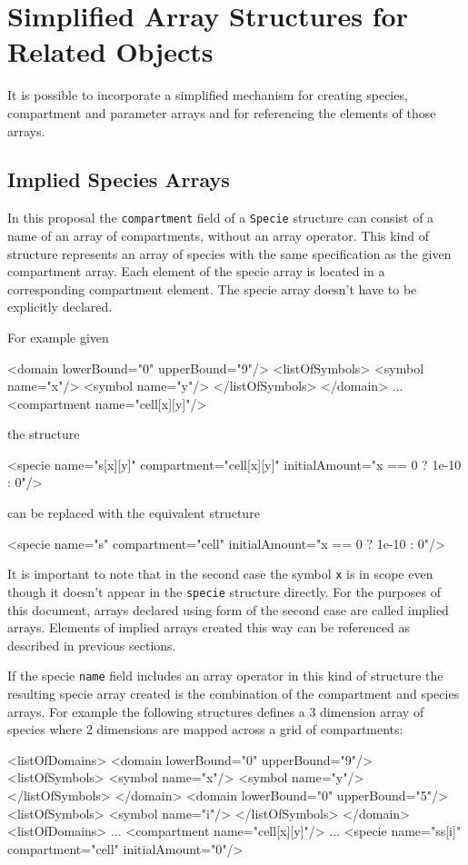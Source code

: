 \documentclass{cekarticle}
\begin{document}
\section{Simplified Array Structures for Related Objects}

It is possible to incorporate a simplified mechanism for creating
species, compartment and parameter arrays and for referencing the
elements of those arrays.

\subsection{Implied Species Arrays}
\label{sec:impliedarrays}

In this proposal the \texttt{compartment} field of a
\texttt{Specie} structure can consist of a name of an array of
compartments, without an array operator. This kind of structure
represents an array of species with the same specification as the
given compartment array.  Each element of the specie array is
located in a corresponding compartment element.  The specie array
doesn't have to be explicitly declared.

For example given
\begin{example}
<domain lowerBound="0" upperBound="9"/>
    <listOfSymbols>
        <symbol name="x"/>
        <symbol name="y"/>
    </listOfSymbols>
</domain>
...
<compartment name="cell[x][y]"/>
\end{example}
the structure
\begin{example}
<specie name="s[x][y]" compartment="cell[x][y]" initialAmount="x == 0 ? 1e-10 : 0"/>
\end{example}
can be replaced with the equivalent structure
\begin{example}
<specie name="s" compartment="cell" initialAmount="x == 0 ? 1e-10 : 0"/>
\end{example}

It is important to note that in the second case the symbol
\texttt{x} is in scope even though it doesn't appear in the
\texttt{specie} structure directly.  For the purposes of this
document, arrays declared using form of the second case are called
implied arrays. Elements of implied arrays created this way can
be referenced as described in previous sections.

If the specie \texttt{name} field includes an array operator in this kind of
structure the resulting specie array created is the combination
of the compartment and species arrays.  For example the following structures defines a 3
dimension array of species where 2 dimensions are mapped across a
grid of compartments:
\begin{example}
<listOfDomains>
    <domain lowerBound="0" upperBound="9"/>
        <listOfSymbols>
            <symbol name="x"/>
            <symbol name="y"/>
        </listOfSymbols>
    </domain>
    <domain lowerBound="0" upperBound="5"/>
        <listOfSymbols>
            <symbol name="i"/>
        </listOfSymbols>
    </domain>
<listOfDomains>
...
<compartment name="cell[x][y]"/>
...
<specie name="ss[i]" compartment="cell" initialAmount="0"/>
\end{example}
\end{document}
